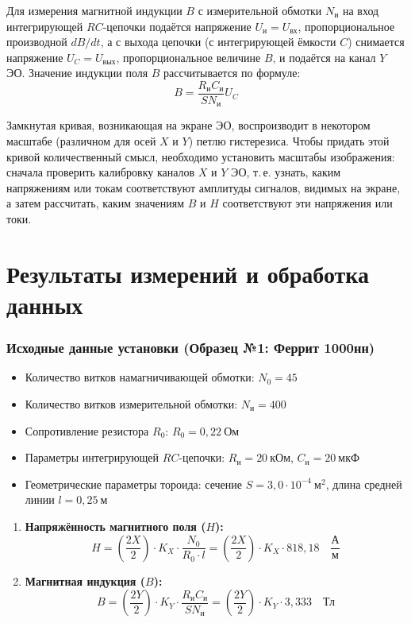 \documentclass[12pt, letterpaper]{article}
\begin{document}
Для измерения магнитной индукции $B$ с измерительной обмотки $N_{\text{и}}$ на вход интегрирующей $RC$-цепочки подаётся напряжение $U_{\text{и}} = U_{\text{вх}}$, пропорциональное производной $dB/dt$, а с выхода цепочки (с интегрирующей ёмкости $C$) снимается напряжение $U_C = U_{\text{вых}}$, пропорциональное величине $B$, и подаётся на канал $Y$ ЭО. Значение индукции поля $B$ рассчитывается по формуле:
\begin{equation}
    B = \frac{R_{\text{и}} C_{\text{и}}}{S N_{\text{и}}} U_C
\end{equation}

Замкнутая кривая, возникающая на экране ЭО, воспроизводит в некотором масштабе (различном для осей $X$ и $Y$) петлю гистерезиса. Чтобы придать этой кривой количественный смысл, необходимо установить масштабы изображения: сначала проверить калибровку каналов $X$ и $Y$ ЭО, т.\,е. узнать, каким напряжениям или токам соответствуют амплитуды сигналов, видимых на экране, а затем рассчитать, каким значениям $B$ и $H$ соответствуют эти напряжения или токи.

\section*{Результаты измерений и обработка данных}

\subsubsection*{Исходные данные установки (Образец №1: Феррит 1000нн)}
\begin{itemize}
    \item Количество витков намагничивающей обмотки: $N_0 = 45$
    \item Количество витков измерительной обмотки: $N_{\text{и}} = 400$
    \item Сопротивление резистора $R_0$: $R_0 = 0{,}22~\text{Ом}$
    \item Параметры интегрирующей $RC$-цепочки: $R_{\text{и}} = 20~\text{кОм}$, $C_{\text{и}} = 20~\text{мкФ}$
    \item Геометрические параметры тороида: сечение $S = 3{,}0 \cdot 10^{-4}~\text{м}^2$, длина средней линии $l = 0{,}25~\text{м}$
\end{itemize}

\begin{enumerate}
    \item \textbf{Напряжённость магнитного поля ($H$):}
    \begin{equation*}
        H = \left(\frac{2X}{2}\right) \cdot K_X \cdot \frac{N_0}{R_0 \cdot l} = \left(\frac{2X}{2}\right) \cdot K_X \cdot 818{,}18 \quad \frac{\text{А}}{\text{м}}
    \end{equation*}
    \item \textbf{Магнитная индукция ($B$):}
    \begin{equation*}
        B = \left(\frac{2Y}{2}\right) \cdot K_Y \cdot \frac{R_{\text{и}} C_{\text{и}}}{S N_{\text{и}}} = \left(\frac{2Y}{2}\right) \cdot K_Y \cdot 3{,}333 \quad \text{Тл}
    \end{equation*}
\end{enumerate}
\end{document}
